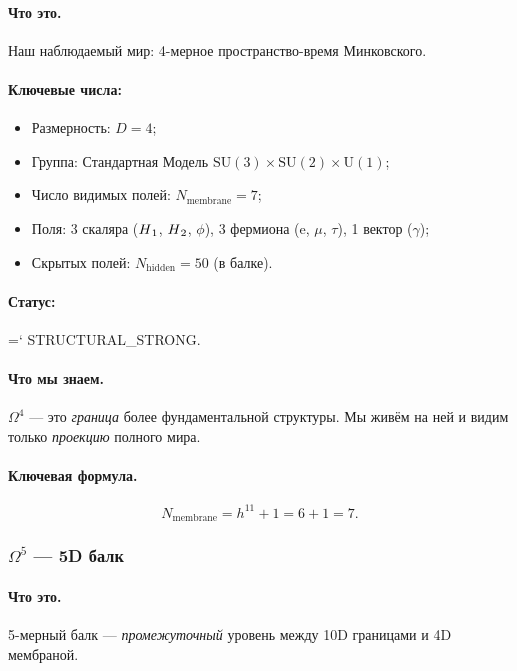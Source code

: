 \documentclass[11pt,a4paper]{article}
\newcommand{\SU}{\mathrm{SU}}
\newcommand{\Om}{\Omega^4}
\newcommand{\Omf}{\Omega^5}
\newcommand{\Nhidden}{N_{\text{hidden}}}
\newcommand{\Nmembrane}{N_{\text{membrane}}}
\newcommand{\Hone}{H\textsubscript{1}}
\newcommand{\Htwo}{H\textsubscript{2}}
\renewcommand{\texttt}[1]{{\ttfamily\hyphenchar\font=`\- #1}}
\theoremstyle{definition}
\begin{document}
\paragraph{Что это.}
Наш наблюдаемый мир: 4-мерное пространство-время Минковского.

\paragraph{Ключевые числа:}
\begin{itemize}
    \item Размерность: $D = 4$;
    \item Группа: Стандартная Модель 
          $\SU(3) \times \SU(2) \times \mathrm{U}(1)$;
    \item Число видимых полей: $\Nmembrane = 7$;
    \item Поля: 3 скаляра ($\Hone$, $\Htwo$, $\phi$), 3 фермиона 
          (e, $\mu$, $\tau$), 1 вектор ($\gamma$);
    \item Скрытых полей: $\Nhidden = 50$ (в балке).
\end{itemize}

\paragraph{Статус:} \texttt{STRUCTURAL\_STRONG}.

\paragraph{Что мы знаем.}
$\Om$ — это \emph{граница} более фундаментальной структуры. 
Мы живём на ней и видим только \emph{проекцию} полного мира.

\paragraph{Ключевая формула.}
\begin{equation}
    \Nmembrane = h^{11} + 1 = 6 + 1 = 7.
\end{equation}

\subsubsection{$\Omf$ --- 5D балк}

\paragraph{Что это.}
5-мерный балк — \emph{промежуточный} уровень между 10D 
границами и 4D мембраной.
\end{document}
